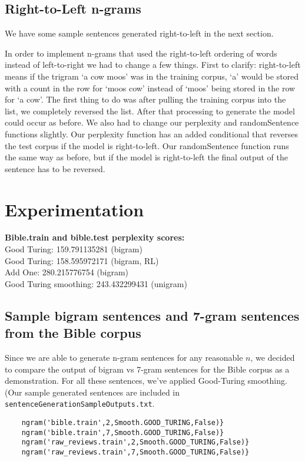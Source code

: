 \documentclass{article}
\begin{document}
\subsection{Right-to-Left n-grams}
We have some sample sentences generated right-to-left in the next section.\par
In order to implement n-grams that used the right-to-left ordering of words instead of left-to-right we had to change a few things. First to clarify: right-to-left means if the trigram `a cow moos' was in the training corpus, `a' would be stored with a count in the row for `moos cow' instead of `moos' being stored in the row for `a cow'. The first thing to do was after pulling the training corpus into the list, we completely reversed the list. After that processing to generate the model could occur as before. We also had to change our perplexity and randomSentence functions slightly. Our perplexity function has an added conditional that reverses the test corpus if the model is right-to-left. Our randomSentence function runs the same way as before, but if the model is right-to-left the final output of the sentence has to be reversed.

\section{Experimentation}

\textbf{Bible.train and bible.test perplexity scores:}\\
Good Turing: 159.791135281 (bigram)\\
Good Turing: 158.595972171 (bigram, RL)\\
Add One: 280.215776754 (bigram)\\
Good Turing smoothing: 243.432299431 (unigram)\par

\subsection{Sample bigram sentences and 7-gram sentences from the Bible corpus}
Since we are able to generate n-gram sentences for any reasonable $n$, we decided to compare the output of bigram vs 7-gram sentences for the Bible corpus as a demonstration. For all these sentences, we've applied Good-Turing smoothing. (Our sample generated sentences are included in \texttt{sentenceGenerationSampleOutputs.txt}.
\begin{verbatim}
    ngram('bible.train',2,Smooth.GOOD_TURING,False)}
    ngram('bible.train',7,Smooth.GOOD_TURING,False)}
    ngram('raw_reviews.train',2,Smooth.GOOD_TURING,False)}
    ngram('raw_reviews.train',7,Smooth.GOOD_TURING,False)}
\end{verbatim}
\end{document}
